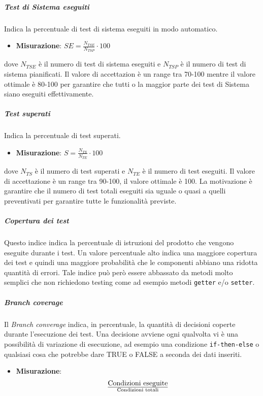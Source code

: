 \subparagraph{Test di Sistema eseguiti}
Indica la percentuale di test di sistema eseguiti in modo automatico.
\begin{itemize}
\item \textbf{Misurazione}: $SE=\frac{N_{TSE}}{N_{TSP}} \cdot 100$
\end{itemize}
dove $N_{TSE}$ è il numero di test di sistema eseguiti e $N_{TSP}$ è il numero di test di sistema pianificati.
Il valore di accettazion è un range tra 70-100 mentre il valore ottimale è 80-100 per garantire che tutti o la maggior parte dei test di Sistema siano eseguiti effettivamente.

\subparagraph{Test superati}

Indica la percentuale di test superati.
\begin{itemize}
\item \textbf{Misurazione}: $S=\frac{N_{TS}}{N_{TE}} \cdot 100$
\end{itemize}
dove $N_{TS}$ è il numero di test superati e $N_{TE}$ è il numero di test eseguiti.
Il valore di accettazione è un range tra 90-100, il valore ottimale è 100. La motivazione è  garantire che il numero di test totali eseguiti sia uguale o quasi a quelli preventivati per garantire tutte le funzionalità previste. \\

\subparagraph{Copertura dei test}
Questo indice indica la percentuale di istruzioni del prodotto che vengono eseguite durante i test.
Un valore percentuale alto indica una maggiore copertura dei test e quindi una maggiore probabilità che le componenti abbiano una ridotta quantità di errori.
Tale indice può però essere abbassato da metodi molto semplici che non richiedono testing come ad esempio metodi \texttt{getter} e/o \texttt{setter}.

\subparagraph{Branch coverage}
Il \textit{Branch converage} indica, in percentuale, la quantità di decisioni coperte durante l'esecuzione dei test. Una decisione avviene ogni qualvolta vi è una possibilità di variazione di esecuzione, ad esempio una condizione \texttt{if-then-else} o qualsiasi cosa che potrebbe dare TRUE o FALSE a seconda dei dati inseriti.
\begin{itemize}
\item \textbf{Misurazione}:
\begin{displaymath}
{\text{Condizioni eseguite}}\over{\text{Condizioni totali}}
\end{displaymath} 
\end{itemize}

